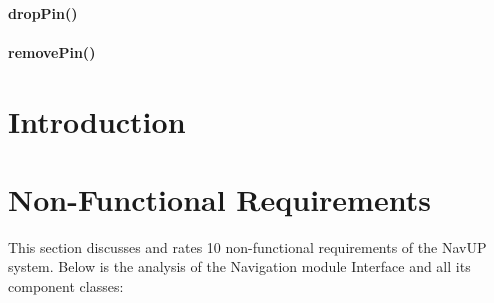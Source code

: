 \documentclass[runningheads,a4paper]{article}
\begin{document}
	\paragraph{dropPin()}
	\begin{itemize}
	
	\end{itemize}
	
	\paragraph{removePin()}
	\begin{itemize}
	
	\end{itemize}
	
\newpage

\section{Introduction}

	\section{Non-Functional Requirements}
	
	This section discusses and rates 10 non-functional requirements of the NavUP system.
	Below is the analysis of the Navigation module Interface and all its component classes:
	
\end{document}

